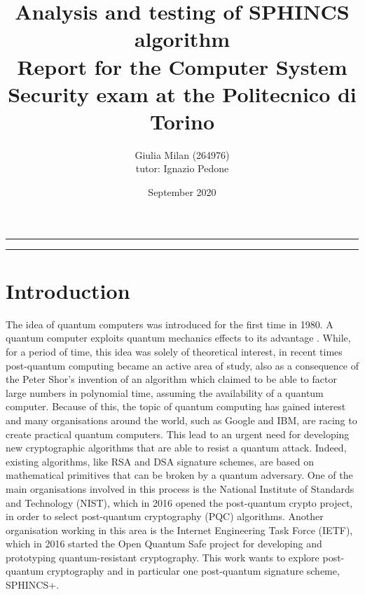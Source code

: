 \documentclass[a4paper,12pt]{article}
\begin{document}
\title{Analysis and testing of SPHINCS algorithm
\\
{\normalsize Report for the Computer System Security exam at the Politecnico di Torino}
}
\author{Giulia Milan (264976)
\\
{\normalsize tutor: Ignazio Pedone}
}
\date{September 2020}
\maketitle

\vfill

\rule{\textwidth}{1pt}

\tableofcontents

\rule{\textwidth}{1pt}

\vfill

\newpage

\section{Introduction}

The idea of quantum computers was introduced for the first time in 1980. A quantum computer exploits quantum mechanics effects to its advantage \cite{0_historyQC}. While, for a period of time, this idea was solely of theoretical interest, in recent times post-quantum computing became an active area of study, also as a consequence of the Peter Shor's invention of an algorithm which claimed to be able to factor large numbers in polynomial time, assuming the availability of a quantum computer. 
Because of this, the topic of quantum computing has gained interest and many organisations around the world, such as Google and IBM, are racing to create practical quantum computers.
This lead to an urgent need for developing new cryptographic algorithms that are able to resist a quantum attack. Indeed, existing algorithms, like RSA and DSA signature schemes, are based on mathematical primitives that can be broken by a quantum adversary.
One of the main organisations involved in this process is the National Institute of Standards and
Technology (NIST), which in 2016 opened the post-quantum crypto project, in order to select post-quantum cryptography (PQC) algorithms. Another organisation working in this area is the Internet Engineering Task Force (IETF), which in 2016 started the Open Quantum Safe project for developing and prototyping quantum-resistant cryptography.
This work wants to explore post-quantum cryptography and in particular one post-quantum signature scheme, SPHINCS+.
\end{document}
